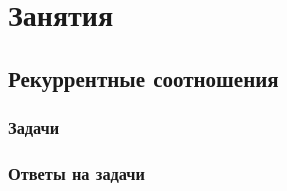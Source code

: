 \documentclass[14pt,openany]{book}
\begin{document}
\begingroup
\hypersetup{linkcolor=black}
\tableofcontents
\endgroup

\clearpage

\part{Занятия}

\chapter{Рекуррентные соотношения}



\section{Задачи}



\section{Ответы на задачи}
\end{document}
